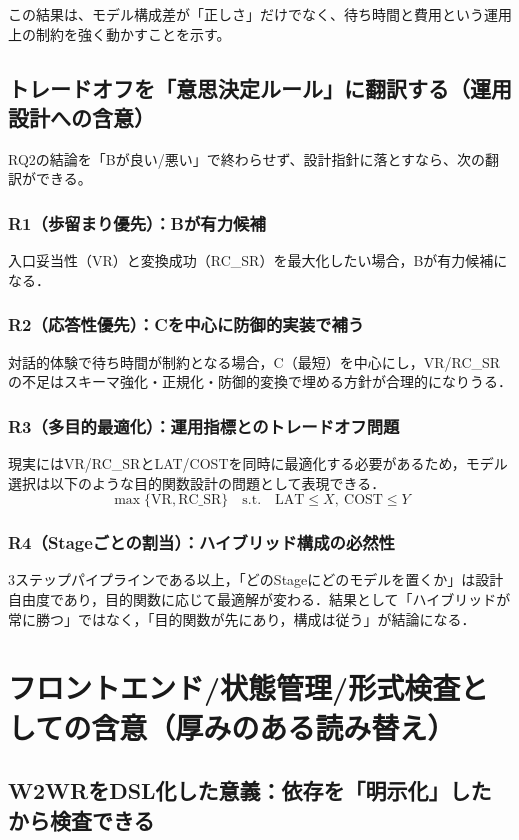 \documentclass[senior,final,11pt,dvipdfmx]{iputit-thesis}
\begin{document}
この結果は、モデル構成差が「正しさ」だけでなく、待ち時間と費用という運用上の制約を強く動かすことを示す。

\subsection{トレードオフを「意思決定ルール」に翻訳する（運用設計への含意）}
\label{subsec:disc_rq2_tradeoff}

RQ2の結論を「Bが良い/悪い」で終わらせず、設計指針に落とすなら、次の翻訳ができる。
\subsubsection{R1（歩留まり優先）：Bが有力候補}
入口妥当性（VR）と変換成功（RC\_SR）を最大化したい場合，Bが有力候補になる．

\subsubsection{R2（応答性優先）：Cを中心に防御的実装で補う}
対話的体験で待ち時間が制約となる場合，C（最短）を中心にし，VR/RC\_SRの不足はスキーマ強化・正規化・防御的変換で埋める方針が合理的になりうる．

\subsubsection{R3（多目的最適化）：運用指標とのトレードオフ問題}
現実にはVR/RC\_SRとLAT/COSTを同時に最適化する必要があるため，モデル選択は以下のような目的関数設計の問題として表現できる．
\[
  \max \{ \mathrm{VR}, \mathrm{RC\_SR} \} \quad \text{s.t.} \quad \mathrm{LAT} \le X,\ \mathrm{COST} \le Y
\]

\subsubsection{R4（Stageごとの割当）：ハイブリッド構成の必然性}
3ステップパイプラインである以上，「どのStageにどのモデルを置くか」は設計自由度であり，目的関数に応じて最適解が変わる．結果として「ハイブリッドが常に勝つ」ではなく，「目的関数が先にあり，構成は従う」が結論になる．

\section{フロントエンド/状態管理/形式検査としての含意（厚みのある読み替え）}
\label{sec:disc_frontend}

\subsection{W2WRをDSL化した意義：依存を「明示化」したから検査できる}
\label{subsec:disc_frontend_w2wr}
\end{document}

